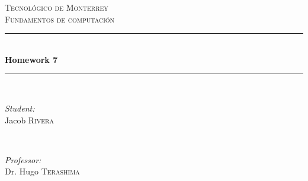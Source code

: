 \documentclass{article}
\begin{document}
\begin{titlepage}

    \newcommand{\HRule}{\rule{\linewidth}{0.5mm}} %

    \center %


    \textsc{\LARGE Tecnológico de Monterrey}\\[1.5cm] %
    \textsc{\Large Fundamentos de computación}\\[0.5cm] %


    \HRule \\[0.4cm]
    { \huge \bfseries Homework 7}\\[0.4cm] %
    \HRule \\[1.5cm]


    \begin{minipage}{0.4\textwidth}
    \begin{flushleft} \large
    \emph{Student:}\\
    Jacob \textsc{Rivera} %
    \end{flushleft}
    \end{minipage}
    ~
    \begin{minipage}{0.4\textwidth}
    \begin{flushright} \large
    \emph{Professor:} \\
    Dr. Hugo \textsc{Terashima} %
    \end{flushright}
    \end{minipage}\\[2cm]


\end{titlepage}
\end{document}
